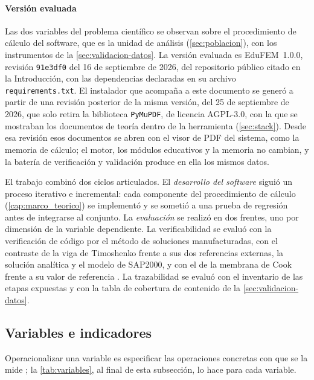 \paragraph{Versión evaluada} Las dos variables del problema científico se observan sobre el procedimiento de cálculo del software, que es la unidad de análisis (\autoref{sec:poblacion}), con los instrumentos de la \autoref{sec:validacion-datos}. La versión evaluada es EduFEM~1.0.0, revisión \texttt{91e3df0} del 16 de septiembre de 2026, del repositorio público citado en la Introducción, con las dependencias declaradas en su archivo \texttt{requirements.txt}. El instalador que acompaña a este documento se generó a partir de una revisión posterior de la misma versión, del 25 de septiembre de 2026, que solo retira la biblioteca \texttt{PyMuPDF}, de licencia AGPL-3.0, con la que se mostraban los documentos de teoría dentro de la herramienta (\autoref{sec:stack}). Desde esa revisión esos documentos se abren con el visor de PDF del sistema, como la memoria de cálculo; el motor, los módulos educativos y la memoria no cambian, y la batería de verificación y validación produce en ella los mismos datos.

El trabajo combinó dos ciclos articulados. El \emph{desarrollo del software} siguió un proceso iterativo e incremental: cada componente del procedimiento de cálculo (\autoref{cap:marco_teorico}) se implementó y se sometió a una prueba de regresión antes de integrarse al conjunto. La \emph{evaluación} se realizó en dos frentes, uno por dimensión de la variable dependiente. La verificabilidad se evaluó con la verificación de código por el método de soluciones manufacturadas, con el contraste de la viga de Timoshenko frente a sus dos referencias externas, la solución analítica y el modelo de SAP2000, y con el de la membrana de Cook frente a su valor de referencia \autocite{oberkampf2010vv,salari2000mms}. La trazabilidad se evaluó con el inventario de las etapas expuestas y con la tabla de cobertura de contenido de la \autoref{sec:validacion-datos}.

\subsection{Variables e indicadores}
\label{sec:variables-met}

Operacionalizar una variable es especificar las operaciones concretas con que se la mide \autocite[p.~137]{sampieri2018metodologia}; la \autoref{tab:variables}, al final de esta subsección, lo hace para cada variable.

